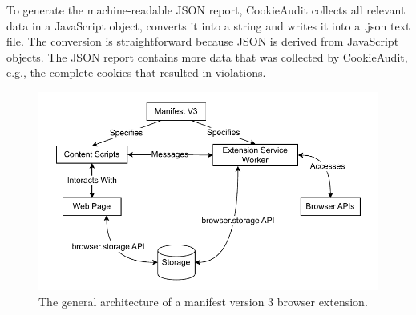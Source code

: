 To generate the machine-readable JSON report, CookieAudit collects all relevant data in a JavaScript object, converts it into a string and writes it into a .json text file.
The conversion is straightforward because JSON is derived from JavaScript objects.
The JSON report contains more data that was collected by CookieAudit, e.g., the complete cookies that resulted in violations.

\begin{figure}
	\centering
	\includegraphics[width=\textwidth]{media/browser-extension-architecture.drawio.pdf}
    \caption{The general architecture of a manifest version 3 browser extension.}
    \label{fig:extension-architecture}
\end{figure}
